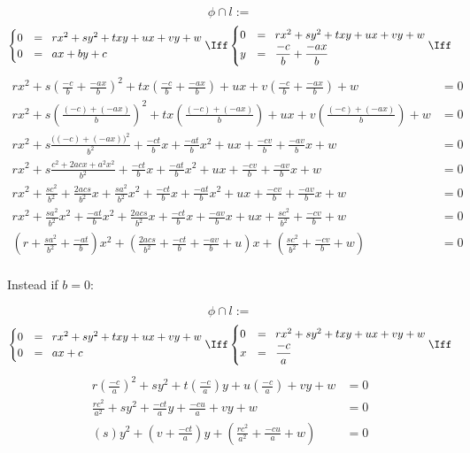 \documentclass[11pt,a4paper,english]{article}
\begin{document}
    \[
    \phi \cap l :=
    \]
    \[
    \begin{cases}
    	0 &=\;\; rx^{2} + sy^{2} + txy + ux + vy + w \\
		0 &=\;\; ax + by + c
    \end{cases} \Iff
    \begin{cases}
    	0 &=\;\; rx^{2} + sy^{2} + txy + ux + vy + w \\
		y &=\;\; \displaystyle\frac{-c}{b} + \displaystyle\frac{-ax}{b}
    \end{cases} \Iff
    \]
    \begin{align*}
    rx^{2} + s\left(\frac{-c}{b} + \frac{-ax}{b}\right)^{2} + tx\left(\frac{-c}{b} + \frac{-ax}{b}\right) + ux + v\left(\frac{-c}{b} + \frac{-ax}{b}\right) + w &= 0
    \\
	rx^{2} + s\left(\frac{(-c) + (-ax)}{b}\right)^{2} + tx\left(\frac{(-c) + (-ax)}{b}\right) + ux + v\left(\frac{(-c) + (-ax)}{b}\right) + w &= 0
	\\
	rx^{2} + s\frac{\big((-c) + (-ax)\big)^{2}}{b^{2}} + \frac{-ct}{b}x + \frac{-at}{b}x^{2} + ux + \frac{-cv}{b} + \frac{-av}{b}x + w &= 0
	\\
	rx^{2} + s\frac{c^{2} + 2acx + a^{2}x^{2}}{b^{2}} + \frac{-ct}{b}x + \frac{-at}{b}x^{2} + ux + \frac{-cv}{b} + \frac{-av}{b}x + w &= 0
	\\
	rx^{2} + \frac{sc^{2}}{b^{2}} + \frac{2acs}{b^{2}}x + \frac{sa^{2}}{b^{2}}x^{2} + \frac{-ct}{b}x + \frac{-at}{b}x^{2} + ux + \frac{-cv}{b} + \frac{-av}{b}x + w &= 0
	\\
	rx^{2} + \frac{sa^{2}}{b^{2}}x^{2} + \frac{-at}{b}x^{2} + \frac{2acs}{b^{2}}x + \frac{-ct}{b}x + \frac{-av}{b}x + ux + \frac{sc^{2}}{b^{2}} + \frac{-cv}{b} + w &= 0
	\\
	\left(r + \frac{sa^{2}}{b^{2}} + \frac{-at}{b}\right)x^{2} + \left(\frac{2acs}{b^{2}} + \frac{-ct}{b} + \frac{-av}{b} + u\right)x + \left(\frac{sc^{2}}{b^{2}} + \frac{-cv}{b} + w\right) &= 0
	\\
    \end{align*}
    
    \ppar
    Instead if \(b = 0\):
    
    \[
    \phi \cap l :=
    \]
    \[
    \begin{cases}
    	0 &=\;\; rx^{2} + sy^{2} + txy + ux + vy + w \\
		0 &=\;\; ax + c
    \end{cases} \Iff
    \begin{cases}
    	0 &=\;\; rx^{2} + sy^{2} + txy + ux + vy + w \\
		x &=\;\; \displaystyle\frac{-c}{a}
    \end{cases} \Iff
    \]
    \begin{align*}
    r\left(\frac{-c}{a}\right)^{2} + sy^{2} + t\left(\frac{-c}{a}\right)y + u\left(\frac{-c}{a}\right) + vy + w &= 0
    \\
    \frac{rc^{2}}{a^{2}} + sy^{2} + \frac{-ct}{a}y + \frac{-cu}{a} + vy + w &= 0
    \\
    \left(s\right)y^{2} + \left(v + \frac{-ct}{a}\right)y + \left(\frac{rc^{2}}{a^{2}} + \frac{-cu}{a} + w\right) &= 0
    \\
    \end{align*}
    
%    
    
    
\end{document}
